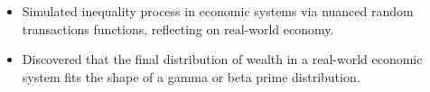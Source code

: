 

\begin{itemize}[nosep]
  \item Simulated inequality process in economic systems via nuanced random transactions functions, reflecting on real-world economy.
  \item Discovered that the final distribution of wealth in a real-world economic system fits the shape of a gamma or beta prime distribution.
\end{itemize}
